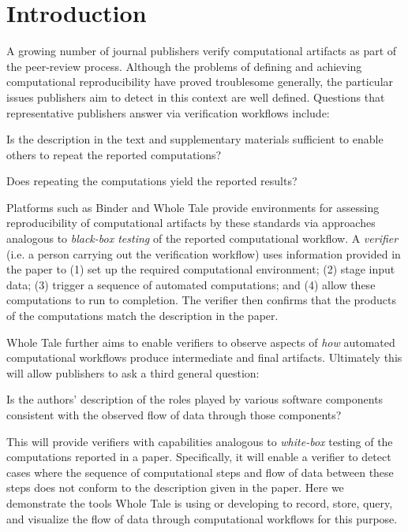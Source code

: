 \section{Introduction}

A growing number of journal publishers verify computational artifacts as part of the peer-review process. Although the problems of defining and achieving computational reproducibility have proved troublesome generally, the particular issues publishers aim to detect in this context are well defined. Questions that representative publishers answer via verification workflows include:

\begin{itemize}

\tinyitem Is the description in the text and supplementary materials sufficient to enable others to repeat the reported computations?

\tinyitem Does repeating the computations yield the reported results?

\end{itemize}

Platforms such as Binder \cite{Binder_2018} and Whole Tale  \cite{brinckman2019computing} provide environments for assessing reproducibility of computational artifacts by these standards via approaches analogous to \emph{black-box testing} of the reported computational workflow. A \emph{verifier} (i.e. a person carrying out the verification workflow) uses information provided in the paper to (1) set up the required computational environment; (2) stage input data; (3) trigger a sequence of automated computations; and (4) allow these computations to run to completion. The verifier then confirms that the products of the computations match the description in the paper.

Whole Tale further aims to enable verifiers to observe aspects of \emph{how} automated computational workflows produce intermediate and final artifacts. Ultimately this will allow publishers to ask a third general question:

\begin{itemize}

\tinyitem Is the authors' description of the roles played by various software components consistent with the observed flow of data through those components?

\end{itemize}

This will provide verifiers with capabilities analogous to \emph{white-box} testing of the computations reported in a paper. Specifically, it will enable a verifier to detect cases where the sequence of computational steps and flow of data between these steps does not conform to the description given in the paper. Here we demonstrate the tools Whole Tale is using or developing to record, store, query, and visualize the flow of data through computational workflows for this purpose.








